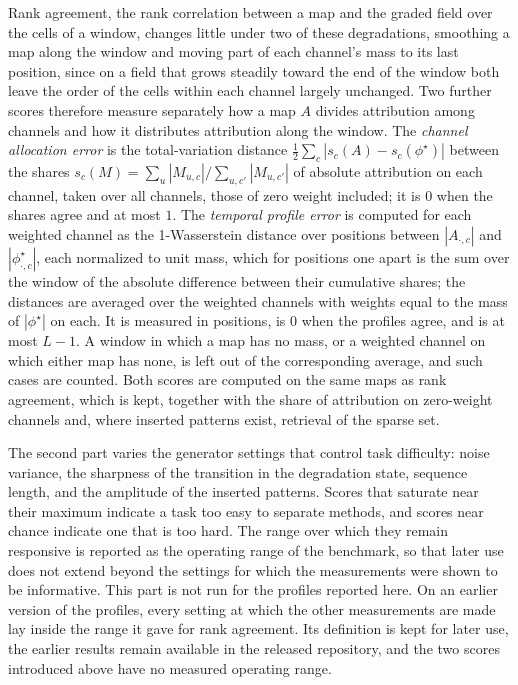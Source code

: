 \documentclass{article}
\newif\ifreview \reviewtrue        %
\newcommand{\rev}[1]{\ifreview\textcolor[HTML]{0B5FA5}{#1}\else#1\fi}
\newcommand{\revwhy}[1]{\ifreview\marginpar{\footnotesize\raggedright\textcolor[HTML]{0B5FA5}{#1}}\fi}
\begin{document}
\rev{Rank agreement, the rank correlation between a map and the graded field over the cells of a window, changes little under two of these degradations, smoothing a map along the window and moving part of each channel's mass to its last position, since on a field that grows steadily toward the end of the window both leave the order of the cells within each channel largely unchanged. Two further scores therefore measure separately how a map $A$ divides attribution among channels and how it distributes attribution along the window. The \emph{channel allocation error} is the total-variation distance $\frac{1}{2}\sum_{c} |s_c(A) - s_c(\phi^{\star})|$ between the shares $s_c(M) = \sum_{u} |M_{u,c}| / \sum_{u,c'} |M_{u,c'}|$ of absolute attribution on each channel, taken over all channels, those of zero weight included; it is $0$ when the shares agree and at most $1$. The \emph{temporal profile error} is computed for each weighted channel as the 1-Wasserstein distance over positions between $|A_{\cdot,c}|$ and $|\phi^{\star}_{\cdot,c}|$, each normalized to unit mass, which for positions one apart is the sum over the window of the absolute difference between their cumulative shares; the distances are averaged over the weighted channels with weights equal to the mass of $|\phi^{\star}|$ on each. It is measured in positions, is $0$ when the profiles agree, and is at most $L-1$. A window in which a map has no mass, or a weighted channel on which either map has none, is left out of the corresponding average, and such cases are counted. Both scores are computed on the same maps as rank agreement, which is kept, together with the share of attribution on zero-weight channels and, where inserted patterns exist, retrieval of the sparse set.}\revwhy{X5: channel allocation and temporal profile errors}
 
The second part varies the generator settings that control task difficulty: noise variance, the sharpness of the transition in the degradation state, sequence length, and the amplitude of the inserted patterns. Scores that saturate near their maximum indicate a task too easy to separate methods, and scores near chance indicate one that is too hard. The range over which they remain responsive is reported as the operating range of the benchmark, so that later use does not extend beyond the settings for which the measurements were shown to be informative. \rev{This part is not run for the profiles reported here. On an earlier version of the profiles, every setting at which the other measurements are made lay inside the range it gave for rank agreement. Its definition is kept for later use, the earlier results remain available in the released repository, and the two scores introduced above have no measured operating range.}\revwhy{X8: operating range not reported (D25)}
 
\end{document}
